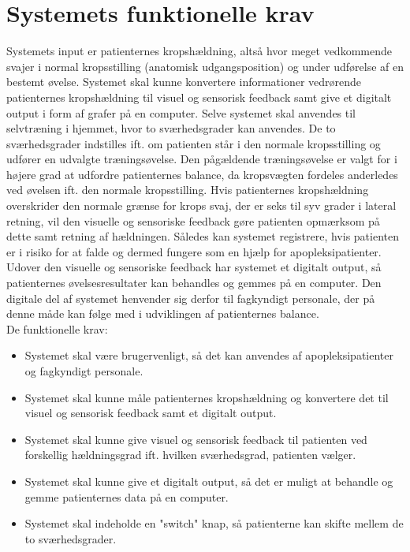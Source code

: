 \section{Systemets funktionelle krav}
Systemets input er patienternes kropshældning, altså hvor meget vedkommende svajer i normal kropsstilling (anatomisk udgangsposition) og under udførelse af en bestemt øvelse. Systemet skal kunne konvertere informationer vedrørende patienternes kropshældning til visuel og sensorisk feedback samt give et digitalt output i form af grafer på en computer. Selve systemet skal anvendes til selvtræning i hjemmet, hvor to sværhedsgrader kan anvendes. De to sværhedsgrader indstilles ift. om patienten står i den normale kropsstilling og udfører en udvalgte træningsøvelse. Den pågældende træningsøvelse er valgt for i højere grad at udfordre patienternes balance, da kropsvægten fordeles anderledes ved øvelsen ift. den normale kropsstilling. Hvis patienternes kropshældning overskrider den normale grænse for krops svaj, der er seks til syv grader i lateral retning, vil den visuelle og sensoriske feedback gøre patienten opmærksom på dette samt retning af hældningen. Således kan systemet registrere, hvis patienten er i risiko for at falde og dermed fungere som en hjælp for apopleksipatienter. Udover den visuelle og sensoriske feedback har systemet et digitalt output, så patienternes øvelsesresultater kan behandles og gemmes på en computer. Den digitale del af systemet henvender sig derfor til fagkyndigt personale, der på denne måde kan følge med i udviklingen af patienternes balance.\\

De funktionelle krav:
\begin{itemize}
\item Systemet skal være brugervenligt, så det kan anvendes af apopleksipatienter og fagkyndigt personale.
\item Systemet skal kunne måle patienternes kropshældning og konvertere det til visuel og sensorisk feedback samt et digitalt output.
\item Systemet skal kunne give visuel og sensorisk feedback til patienten ved forskellig hældningsgrad ift. hvilken sværhedsgrad, patienten vælger.
\item Systemet skal kunne give et digitalt output, så det er muligt at behandle og gemme patienternes data på en computer.
\item Systemet skal indeholde en "switch" knap, så patienterne kan skifte mellem de to sværhedsgrader.
\end{itemize}


